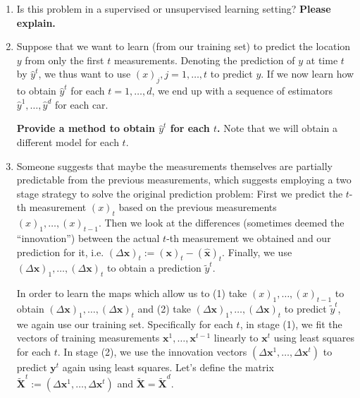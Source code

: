 \documentclass{article}\usepackage[utf8]{inputenc}\usepackage[margin=0.4cm,top=0.4cm,bottom=0.4cm]{geometry}\usepackage[usenames,dvipsnames,svgnames,table]{xcolor}
\begin{document}
\begin{enumerate}
\item Is this problem in a supervised or unsupervised learning setting? \textbf{Please explain.}
\BeginSolution
\EndSolution
\item Suppose that we want to learn (from our training set) to predict the location $y$ from only the first $t$ measurements. Denoting the prediction of $y$ at time $t$ by $\hat{y}^t$, we thus want to use $({x})_{j}, j=1, \ldots, t$ to predict $y$. If we now learn how to obtain $\hat{y}^t$ for each $t= 1,\dots,d$, we end up with a sequence of estimators $\hat{y}^1,\dots, \hat{y}^d$ for each car.
\vspace{3pt}

\noindent \textbf{Provide a method to obtain $\hat{y}^t$ for each $t$.} Note that we will obtain a different model for each $t$. 
\BeginSolution

\EndSolution
\item Someone suggests that maybe the measurements themselves are partially predictable from the previous measurements, which suggests employing a two stage strategy to solve the original prediction problem: First we predict the $t$-th measurement $({x})_{t}$ based on the previous measurements $({x})_{1},\ldots, ({x})_{t-1}$. Then we look at the differences (sometimes deemed the ``innovation'') between the actual $t$-th measurement we obtained and our prediction for it, i.e. $(\Delta \mathbf{x})_{t} := (\mathbf{x})_{t} - (\hat{\mathbf{x}})_{t}$. Finally, we use $(\Delta\mathbf{x})_1,\ldots, (\Delta \mathbf{x})_{t}$ to obtain a prediction $\tilde{y}^t$.
\vspace{3pt}

In order to learn the maps which allow us to (1) take $({x})_{1},\ldots, ({x})_{t-1}$ to obtain $(\Delta\mathbf{x})_1,\ldots, (\Delta \mathbf{x})_{t}$ and (2) take $(\Delta\mathbf{x})_1,\dots, (\Delta \mathbf{x})_{t}$ to predict $\tilde{y}^t$, we again use our training set.  Specifically for each $t$, in stage (1), we fit the vectors of training measurements $\mathbf{x}^1, \ldots, \mathbf{x}^{t-1}$ linearly to $\mathbf{x}^t$ using least squares for each $t$. In stage (2), we use the innovation vectors $(\Delta\mathbf{x}^1, \dots, \Delta\mathbf{x}^t)$ to predict $\mathbf{y}^t$ again using least squares.  Let's define the matrix $\tilde{\mathbf{X}}^t := (\Delta\mathbf{x}^1, \ldots, \Delta\mathbf{x}^t)$ and $\tilde{\mathbf{X}} = \tilde{\mathbf{X}}^d$.
\vspace{3pt}


\end{enumerate}
\end{document}

